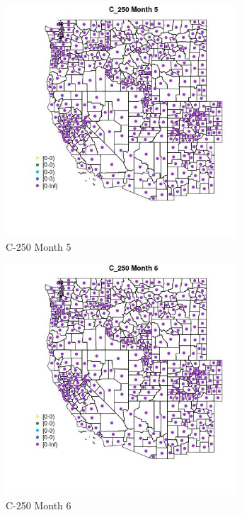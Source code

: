 \begin{figure} 
\centering  
\includegraphics[width=0.77\textwidth]{Code_Outputs/df_report_ML_predictors_CountyCentroid_Locations_Dates_2008-01-01to2018-12-31_MapObsMo5C_250.jpg} 
\caption{\label{fig:df_report_ML_predictors_CountyCentroid_Locations_Dates_2008-01-01to2018-12-31MapObsMo5C_250}C-250 Month 5} 
\end{figure} 
 

\begin{figure} 
\centering  
\includegraphics[width=0.77\textwidth]{Code_Outputs/df_report_ML_predictors_CountyCentroid_Locations_Dates_2008-01-01to2018-12-31_MapObsMo6C_250.jpg} 
\caption{\label{fig:df_report_ML_predictors_CountyCentroid_Locations_Dates_2008-01-01to2018-12-31MapObsMo6C_250}C-250 Month 6} 
\end{figure} 
 

